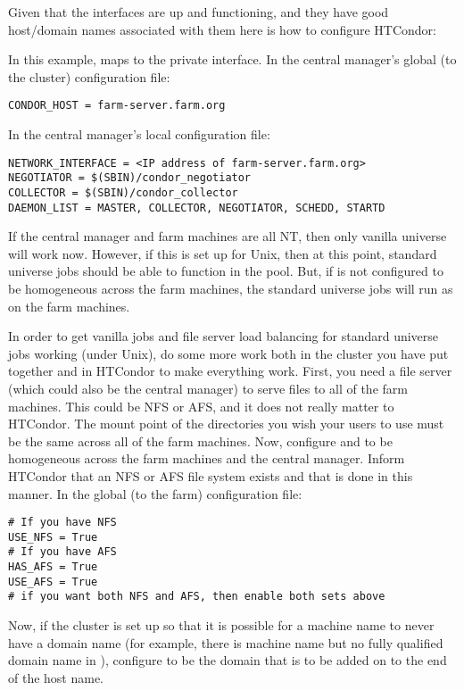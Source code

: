 Given that the interfaces are up and functioning, and they have good
host/domain names associated with them here is how to configure HTCondor:

In this example,  maps to the private interface.
In the central manager's global (to the cluster) configuration file:
\begin{verbatim}
CONDOR_HOST = farm-server.farm.org
\end{verbatim}

In the central manager's local configuration file:
\begin{verbatim}
NETWORK_INTERFACE = <IP address of farm-server.farm.org>
NEGOTIATOR = $(SBIN)/condor_negotiator
COLLECTOR = $(SBIN)/condor_collector
DAEMON_LIST = MASTER, COLLECTOR, NEGOTIATOR, SCHEDD, STARTD
\end{verbatim}

If the central manager and farm machines are all NT, then only
vanilla universe will work now.  However, if this is set up
for Unix, then at this point, standard universe jobs should be able to
function in the pool.
But, if  is not configured
to be homogeneous across the farm machines, the standard universe
jobs will run as  on the farm machines.

In order to get vanilla jobs and file server load balancing for standard
universe jobs working (under Unix), do some more work both in
the cluster you have put together and in HTCondor to make everything work.
First, you need a file server (which could also be the central manager) to
serve files to all of the farm machines. This could be NFS or AFS, 
and it does not really matter to HTCondor. 
The mount point of the directories you wish
your users to use must be the same across all of the farm machines. Now,
configure  and  to be
homogeneous across the farm machines and the central manager. 
Inform HTCondor that an NFS or AFS file system exists and that
is done in this manner. In the global (to the farm) configuration file:

\begin{verbatim}
# If you have NFS
USE_NFS = True
# If you have AFS
HAS_AFS = True
USE_AFS = True
# if you want both NFS and AFS, then enable both sets above
\end{verbatim}

Now, if the cluster is set up so that it is possible for a machine
name to never have a domain name
(for example, there is machine
name but no fully qualified domain name in ),
configure  to be the domain that is
to be added on to the end of the host name.


